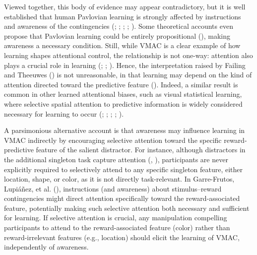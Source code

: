 \documentclass[
  man,
  floatsintext,
  longtable,
  nolmodern,
  notxfonts,
  notimes,
  mask,
  colorlinks=true,linkcolor=blue,citecolor=blue,urlcolor=blue]{apa7}
\begin{document}
Viewed together, this body of evidence may appear contradictory, but it
is well established that human Pavlovian learning is strongly affected
by instructions and awareness of the contingencies
(;
;
;
;
). Some theoretical
accounts even propose that Pavlovian learning could be entirely
propositional (),
making awareness a necessary condition. Still, while VMAC is a clear
example of how learning shapes attentional control, the relationship is
not one-way: attention also plays a crucial role in learning
(;
;
). Hence, the
interpretation raised by Failing and Theeuwes
() is not unreasonable, in that learning
may depend on the kind of attention directed toward the predictive
feature ().
Indeed, a similar result is common in other learned attentional biases,
such as visual statistical learning, where selective spatial attention
to predictive information is widely considered necessary for learning to
occur (;
;
;
;
).

A parsimonious alternative account is that awareness may influence
learning in VMAC indirectly by encouraging selective attention toward
the specific reward-predictive feature of the salient distractor. For
instance, although distractors in the additional singleton task capture
attention (,
), participants are never explicitly
required to selectively attend to any specific singleton feature, either
location, shape, or color, as it is not directly task-relevant. In
Garre-Frutos, Lupiáñez, et al. (),
instructions (and awareness) about stimulus--reward contingencies might
direct attention specifically toward the reward-associated feature,
potentially making such selective attention both necessary and
sufficient for learning. If selective attention is crucial, any
manipulation compelling participants to attend to the reward-associated
feature (color) rather than reward-irrelevant features (e.g., location)
should elicit the learning of VMAC, independently of awareness.
\end{document}
